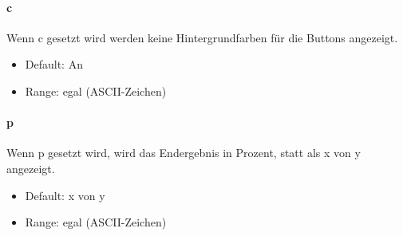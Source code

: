\documentclass[]{article}
\begin{document}
\begin{multicols}{2}
	\paragraph{c}  Wenn c gesetzt wird werden keine Hintergrundfarben für die Buttons angezeigt.
	\begin{itemize}
		\item Default: An
		\item Range: egal (ASCII-Zeichen)
	\end{itemize}

	\paragraph{p}  Wenn p gesetzt wird, wird das Endergebnis in Prozent, statt als x von y angezeigt.
	\begin{itemize}
		\item Default: x von y
		\item Range: egal (ASCII-Zeichen)
	\end{itemize}

	\end{multicols}
\end{document}
